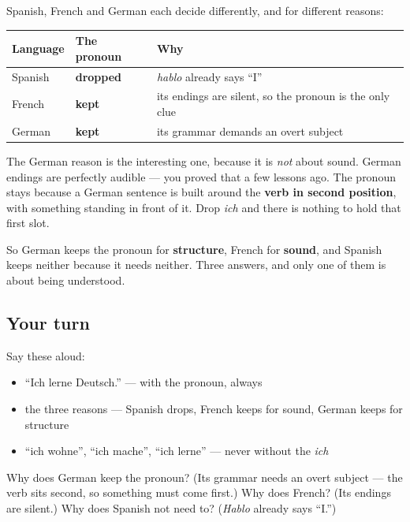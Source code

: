 \begin{grammarlens}[title={Grammar Lens: three languages, three reasons}]
Spanish, French and German each decide differently, and for different reasons:

\noindent
\begin{tabularx}{\linewidth}{@{}>{\raggedright\arraybackslash}X>{\raggedright\arraybackslash}X>{\raggedright\arraybackslash}X@{}}
\toprule
\textbf{Language} & \textbf{The pronoun} & \textbf{Why} \\
\midrule
Spanish & \textbf{dropped} & \emph{hablo} already says \textquotedblleft{}I\textquotedblright{} \\
French & \textbf{kept} & its endings are silent, so the pronoun is the only clue \\
German & \textbf{kept} & its grammar demands an overt subject \\
\bottomrule
\end{tabularx}

The German reason is the interesting one, because it is \emph{not} about sound. German endings are perfectly audible — you proved that a few lessons ago. The pronoun stays because a German sentence is built around the \textbf{verb in second position}, with something standing in front of it. Drop \emph{ich} and there is nothing to hold that first slot.

So German keeps the pronoun for \textbf{structure}, French for \textbf{sound}, and Spanish keeps neither because it needs neither. Three answers, and only one of them is about being understood.
\end{grammarlens}

\subsection*{Your turn}
Say these aloud:

\begin{itemize}
\raggedright
  \item \textquotedblleft{}Ich lerne Deutsch.\textquotedblright{} — with the pronoun, always
  \item the three reasons — Spanish drops, French keeps for sound, German keeps for structure
  \item \textquotedblleft{}ich wohne\textquotedblright{}, \textquotedblleft{}ich mache\textquotedblright{}, \textquotedblleft{}ich lerne\textquotedblright{} — never without the \emph{ich}
\end{itemize}

\begin{tcolorbox}[breakable,colback=teal!4,colframe=teal!35!black,title={Before you move on}]
Why does German keep the pronoun? (Its grammar needs an overt subject — the verb sits second, so something must come first.) Why does French? (Its endings are silent.) Why does Spanish not need to? (\emph{Hablo} already says \textquotedblleft{}I.\textquotedblright{})
\end{tcolorbox}
